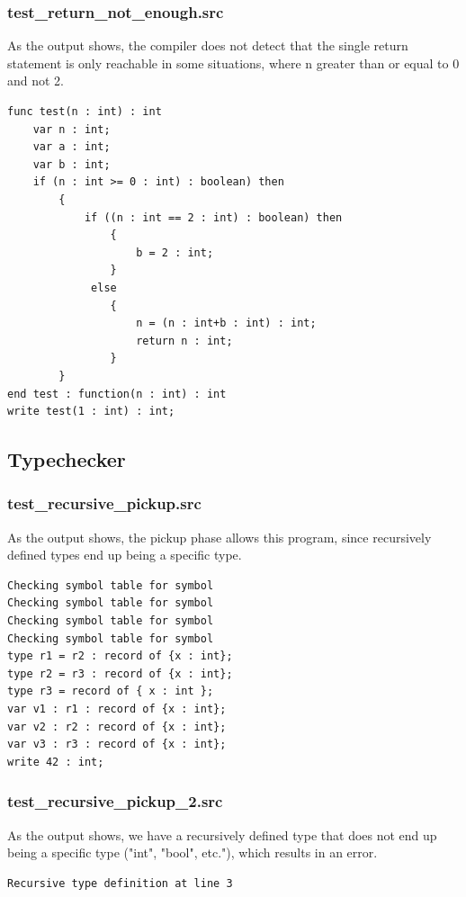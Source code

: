 \documentclass[a4paper,10pt,titlepage]{report}
\begin{document}
\subsubsection{test\_return\_not\_enough.src}
As the output shows, the compiler does not detect that the single return statement is only reachable in some situations, where n greater than or equal to 0 and not 2.
\begin{lstlisting}
func test(n : int) : int
    var n : int;
    var a : int;
    var b : int;
    if (n : int >= 0 : int) : boolean) then
        {
            if ((n : int == 2 : int) : boolean) then
                {
                    b = 2 : int;
                }
             else
                {
                    n = (n : int+b : int) : int;
                    return n : int;
                }
        }
end test : function(n : int) : int
write test(1 : int) : int;
\end{lstlisting}

\subsection{Typechecker}
\subsubsection{test\_recursive\_pickup.src}
As the output shows, the pickup phase allows this program, since recursively defined types end up being a specific type.
\begin{lstlisting}
Checking symbol table for symbol
Checking symbol table for symbol
Checking symbol table for symbol
Checking symbol table for symbol
type r1 = r2 : record of {x : int};
type r2 = r3 : record of {x : int};
type r3 = record of { x : int };
var v1 : r1 : record of {x : int};
var v2 : r2 : record of {x : int};
var v3 : r3 : record of {x : int};
write 42 : int;
\end{lstlisting}

\subsubsection{test\_recursive\_pickup\_2.src}
As the output shows, we have a recursively defined type that does not end up being a specific type ("int", "bool", etc."), which results in an error.
\begin{lstlisting}
Recursive type definition at line 3
\end{lstlisting}
\end{document}
